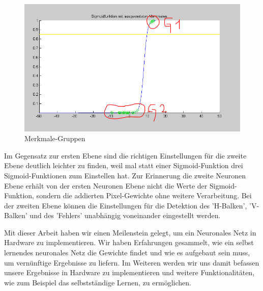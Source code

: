 \begin{figure}[hbt]
	\centering
	\includegraphics[trim=20 25 40 25, clip, width=0.9\linewidth]{./Bilder/Auswertung/MerkmalGruppen}
	\caption{Merkmale-Gruppen}
	\label{mGrup}
\end{figure}

Im Gegensatz zur ersten Ebene sind die richtigen Einstellungen für die zweite Ebene deutlich leichter zu finden, weil mal statt einer Sigmoid-Funktion drei Sigmoid-Funktionen zum Einstellen hat. Zur Erinnerung die zweite Neuronen Ebene erhält von der ersten Neuronen Ebene nicht die Werte der Sigmoid-Funktion, sondern die addierten Pixel-Gewichte ohne weitere Verarbeitung. Bei der zweiten Ebene können die Einstellungen für die Detektion des 'H-Balken', 'V-Balken' und des 'Fehlers' unabhängig voneinander eingestellt werden.

Mit dieser Arbeit haben wir einen Meilenstein gelegt, um ein Neuronales Netz in Hardware zu implementieren. Wir haben Erfahrungen gesammelt, wie ein selbst lernendes neuronales Netz die Gewichte findet und wie es aufgebaut sein muss, um vernünftige Ergebnisse zu liefern. Im Weiteren werden wir uns damit befassen unsere Ergebnisse in Hardware zu implementieren und weitere Funktionalitäten, wie zum Beispiel das selbstständige Lernen, zu ermöglichen.
